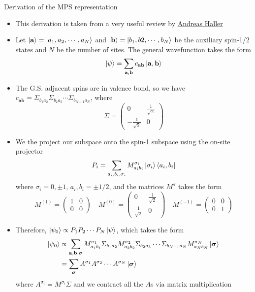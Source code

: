 \documentclass[aspectratio=169,xcolor=dvipsnames, t]{beamer}
\begin{document}
\begin{frame}{Derivation of the MPS representation}
    \begin{itemize}
        \item This derivation is taken from a very useful review by \href{https://www.tmqs.lu/images/haller_bsc.pdf}{Andreas Haller}
        \item Let $\ket{\mathbf a} = \ket{a_1, a_2, \cdots, a_N}$ and $\ket{\mathbf b} = \ket{b_1, b2, \cdots, b_N}$ be the auxiliary spin-1/2 states and $N$ be the number of sites. The general wavefunction takes the form
        $$\ket{\psi} = \sum_{\mathbf a, \mathbf b} c_{\mathbf a\mathbf b} \ket{\mathbf a,\mathbf b}$$
        \item The G.S. adjacent spins are in valence bond, so we have $c_{\mathbf a\mathbf b} = \Sigma_{b_1 a_2}\Sigma_{b_2 a_3}\cdots \Sigma_{b_{N-1} a_{N}}$, where $$\Sigma=\begin{pmatrix}0 & \frac{1}{\sqrt 2}\\-\frac{1}{\sqrt 2} & 0\end{pmatrix}$$
    \end{itemize}
\end{frame}
\begin{frame}
    \begin{itemize}
        \item We the project our subspace onto the spin-1 subspace using the on-site projector
        $$P_i=\sum_{a_i, b_i, \sigma_i} M^{\sigma_i}_{a_ib_i} \ket{\sigma_i}\bra{a_i,b_i}$$
        where $\sigma_i=0,\pm1$, $a_i, b_i = \pm 1/2$, and the matrices $M^\sigma$ takes the form
        $$M^{(1)}=\begin{pmatrix}1 & 0 \\ 0 & 0 \end{pmatrix}\quad M^{(0)}=\begin{pmatrix}0 & \frac{1}{\sqrt 2} \\ \frac{1}{\sqrt 2} & 0 \end{pmatrix}\quad M^{(-1)}=\begin{pmatrix}0 & 0 \\ 0 & 1 \end{pmatrix}$$
        \item Therefore, $\ket{\psi_{0}} \propto P_1 P_2 \cdots P_N \ket{\psi}$, which takes the form
        \begin{align*}
        \ket{\psi_0}&\propto \sum_{\mathbf a, \mathbf b, \boldsymbol \sigma} M^{\sigma_1}_{a_1b_1}\Sigma_{b_1 a_2} M^{\sigma_2}_{a_2 b_2}\Sigma_{b_2 a_3} \cdots \Sigma_{b_{N-1}a_N}M^{\sigma_N}_{a_N b_N} \ket{\boldsymbol{\sigma}}\\
        &= \sum_{\boldsymbol \sigma}A^{\sigma_1}A^{\sigma_2} \cdots A^{\sigma_N} \ket{\boldsymbol \sigma}
        \end{align*}
        where $A^{\sigma_i} = M^{\sigma_i}\Sigma$ and we contract all the $A$s via matrix multiplication
    \end{itemize}
\end{frame}
\end{document}
